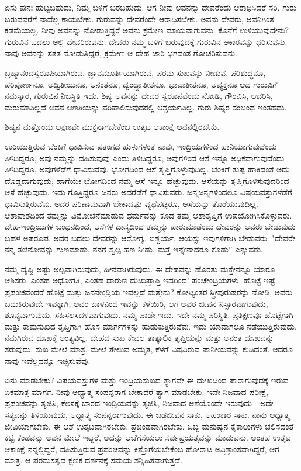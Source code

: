 ಏಸು ಪುನಃ ಹುಟ್ಟಬಹುದು, ನಿಮ್ಮ ಬಳಿಗೆ ಬರಬಹುದು. ಆಗ ನೀವು ಅವನನ್ನು ದೇವರೆಂದು ಆರಾಧಿಸಿದರೆ ಸರಿ. ಗುರು ಬರುವವರೆಗೆ ನಾವೆಲ್ಲ ಕಾಯಬೇಕು. ಗುರುವನ್ನು ದೇವರೆಂದೇ ಆರಾಧಿಸಬೇಕು. ಅವನು ದೇವರು, ಅವನಿಗಿಂತ ಕಡಮೆಯಲ್ಲ. ನೀವು ಅವನನ್ನು ನೋಡುತ್ತಿದ್ದರೆ ಅವನು ಕ್ರಮೇಣ ಮಾಯವಾಗುವನು. ಕೊನೆಗೆ ಉಳಿಯುವುದೇನು? ಗುರುವಿನ ಬದಲು ಅಲ್ಲಿ ದೇವರಿರುವನು. ದೇವರು ನಮ್ಮ ಬಳಿಗೆ ಬರುವುದಕ್ಕೆ ಗುರುವಿನ ಆಕಾರವನ್ನು ಧರಿಸುವನು. ನಾವು ಅವನನ್ನು ಸತತ ನೋಡುತ್ತಿದ್ದರೆ, ಕ್ರಮೇಣ ಆ ದೇಹ ಜಾರಿ ಭಗವಂತ ಗೋಚರಿಸುವನು.

ಬ್ರಹ್ಮಾನಂದಸ್ವರೂಪಿಯಾಗಿರುವ, ಜ್ಞಾನಮೂರ್ತಿಯಾಗಿರುವ, ಪರಮ ಸುಖವನ್ನು ನೀಡುವ, ಪರಿಶುದ್ಧನೂ, ಪರಿಪೂರ್ಣನೂ, ಅದ್ವಿತೀಯನೂ, ಅನಂತನೂ, ದ್ವಂದ್ವಾತೀತನೂ, ಭಾವಾತೀತನೂ, ಅವ್ಯಕ್ತನೂ ಆದ ಗುರುವಿಗೆ ನಮಸ್ಕಾರ, ಗುರುವಿನ ನಿಜಸ್ಥಿತಿ ಇದು. ಶಿಷ್ಯ ಅವನನ್ನು ದೇವರ ಸ್ವರೂಪವೆಂದು ನೋಡಿ, ಗೌರವಿಸಿ, ಆದರಿಸಿ, ಮರುಮಾತಿಲ್ಲದೆ ಅವನ ಆಣತಿಯನ್ನು ಪರಿಪಾಲಿಸುವುದರಲ್ಲಿ ಆಶ್ಚರ್ಯವಿಲ್ಲ. ಗುರು ಶಿಷ್ಯರ ಸಂಬಂಧ ಇಂತಹದು.

ಶಿಷ್ಯನ ಮತ್ತೊಂದು ಲಕ್ಷಣವೇ ಮುಕ್ತನಾಗಬೇಕೆಂಬ ಉತ್ಕಟ ಆಕಾಂಕ್ಷೆ ಅವನಲ್ಲಿರಬೇಕು.

ಉರಿಯುತ್ತಿರುವ ಬೆಂಕಿಗೆ ಧಾವಿಸುವ ಪತಂಗದ ಹುಳುಗಳಂತೆ ನಾವು, ಇಂದ್ರಿಯಗಳಿಂದ ಹಾನಿಯಾಗುವುದೆಂದು ತಿಳಿದಿದ್ದರೂ, ಅವು ನಮ್ಮನ್ನು ದಹಿಸುವುವು ಎಂದು ತಿಳಿದಿದ್ದರೂ, ಅವುಗಳಿಂದ ಆಸೆ ಇನ್ನೂ ಅಧಿಕವಾಗುವುದೆಂದು ತಿಳಿದಿದ್ದರೂ, ಅವುಗಳೆಡೆಗೆ ಧಾವಿಸುವೆವು. ಭೋಗದಿಂದ ಆಸೆ ತೃಪ್ತಿಗೊಳ್ಳುವುದಿಲ್ಲ. ಬೆಂಕಿಗೆ ತುಪ್ಪ ಹಾಕಿದಂತೆ ಅದು ದೊಡ್ಡದಾಗುವುದು; ಹಾಗೆಯೇ ಭೋಗದಿಂದ ನಮ್ಮ ಆಸೆ ಇನ್ನೂ ಹೆಚ್ಚುವುದು. ಆಸೆಯನ್ನು ತೃಪ್ತಿಗೊಳಿಸುವುದರಿಂದ ಆಸೆ ಹೆಚ್ಚುವುದು. ಇದು ಗೊತ್ತಿದ್ದರೂ ಜನರು ಅದರೆಡೆಗೆ ಧಾವಿಸುವರು. ಜನ್ಮಜನ್ಮಗಳಿಂದಲೂ ವಿಷಯವಸ್ತುಗಳೆಡೆಗೆ ಧಾವಿಸುತ್ತಿರುವೆವು. ಅದರ ಪರಿಣಾಮವಾಗಿ ಬೇಕಾದಷ್ಟು ವ್ಯಥೆಪಟ್ಟರೂ, ಆಸೆಯನ್ನು ತೊರೆಯುವುದಿಲ್ಲ. ಆಶಾಪಾಶದಿಂದ ತಮ್ಮನ್ನು ವಿಮೋಚನೆಮಾಡುವ ಧರ್ಮವನ್ನು ಕೂಡ ತಮ್ಮ ಆಶಾತೃಪ್ತಿಗೆ ಉಪಯೋಗಿಸಿಕೊಳ್ಳುವರು. ದೇಹ-ಇಂದ್ರಿಯಗಳ ಬಂಧನದಿಂದ, ಆಸೆಗಳ ದಾಸ್ಯದಿಂದ ತಮ್ಮನ್ನು ಪಾರುಮಾಡೆಂದು ದೇವರನ್ನು ಅವರು ಬೇಡುವುದು ಬಹಳ ಅಪರೂಪ. ಅದರ ಬದಲು ದೇವರನ್ನು ಆರೋಗ್ಯ, ಐಶ್ವರ್ಯ, ಆಯಸ್ಸು ಇವುಗಳಿಗಾಗಿ ಬೇಡುವರು. "ದೇವರೇ ನನ್ನ ತಲೆನೋವನ್ನು ಗುಣಮಾಡು, ನನಗೆ ಸ್ವಲ್ಪ ಹಣ ನೀಡು, ಮತ್ತೆ ಇನ್ನೇನಾದರೂ ಕೊಡು'' ಎನ್ನುವರು.

ನಮ್ಮ ದೃಷ್ಟಿ ಅಷ್ಟು ಅಲ್ಪವಾಗಿರುವುದು, ಹೀನವಾಗಿರುವುದು. ಈ ದೇಹವನ್ನು ಹೊರತು ಮತ್ತೇನನ್ನೂ ಯಾರೂ ಆಶಿಸರು. ಎಂತಹ ಅಧೋಗತಿ, ಎಂತಹ ದಾರುಣ ದುಃಖಪ್ರಾಪ್ತಿ ಇದರಿಂದ! ಪಂಚೇಂದ್ರಿಯಗಳು, ಹೊಟ್ಟೆ ಇಷ್ಟೆ. ಪ್ರಪಂಚವೆಂದರೆ ಹೊಟ್ಟೆ ಮತ್ತು ಜನನೇಂದ್ರಿಯ ಇವಲ್ಲದೆ ಮತ್ತೇನು? ಕೋಟ್ಯಂತರ ಸ್ತ್ರೀಪುರುಷರನ್ನು ನೋಡಿ, ಅವರು ಬದುಕಿರುವುದೇ ಇವಕ್ಕಾಗಿ, ಅವರ ಬಾಳಿನಿಂದ ಇವನ್ನು ಕಳೆಯಿರಿ, ಆಗ ಅವರ ಜೀವನ ನಿಸ್ಸಾರವಾಗುವುದು, ಶೂನ್ಯವಾಗುವುದು, ಸಹಿಸಲಸದಳವಾಗುವುದು. ನಮ್ಮ ಪಾಡೇ ಇದು. ಇದೇ ನಮ್ಮ ಪರಿಸ್ಥಿತಿ. ಪ್ರತಿಕ್ಷಣವೂ ಹೊಟ್ಟೆಗಾಗಿ ಮತ್ತು ಕಾಮಸುಖದ ತೃಪ್ತಿಗಾಗಿ ಹೊಸ ಮಾರ್ಗಗಳನ್ನು ಹುಡುಕುತ್ತಿರುವೆವು. ಇದು ಯಾವಾಗಲೂ ನಡೆಯುತ್ತಿರುವುದು. ನಮಗಿರುವ ದುಃಖಕ್ಕೆ ಅಂತ್ಯವಿಲ್ಲ. ದೇಹದ ಸುಖ ಕೇವಲ ತಾತ್ಕಾಲಿಕ ತೃಪ್ತಿಯನ್ನು ಮತ್ತು ಅನಂತ ದುಃಖವನ್ನು ತರುವುದು. ಸುಖ ಮೇಲೆ ಮಾತ್ರ. ಮೇಲೆ ತೇಲುವ ಅಮೃತ, ಕೆಳಗೆ ವಿಷವಿರುವ ಪಾನೀಯವನ್ನು ಕುಡಿದಂತೆ. ಆದರೂ ನಾವು ಇವೆಲ್ಲವನ್ನೂ ಇಚ್ಛಿಸುವೆವು.

ಏನು ಮಾಡಬೇಕು? ವಿಷಯವಸ್ತುಗಳ ಮತ್ತು ಇಂದ್ರಿಯಸುಖದ ತ್ಯಾಗವೇ ಈ ದುಃಖದಿಂದ ಪಾರಾಗುವುದಕ್ಕೆ ಇರುವ ಏಕಮಾತ್ರ ಮಾರ್ಗ. ನೀವು ಅಧ್ಯಾತ್ಮ ಸಂಪನ್ನರಾಗ ಬೇಕಾದರೆ ತ್ಯಾಗ ಮಾಡಬೇಕು. ಇದೇ ನಿಜವಾದ ಪರೀಕ್ಷೆ, ಪ್ರಪಂಚವನ್ನು ತ್ಯಜಿಸಿ, ಕೆಲಸಕ್ಕೆ ಬಾರದ ಇಂದ್ರಿಯವನ್ನು ತ್ಯಜಿಸಿ, ನಿಜವಾದ ಆಶೆಯೊಂದೇ ಇರುವುದು - ಅದೇ ಸತ್ಯವನ್ನು ತಿಳಿಯುವುದು, ಅಧ್ಯಾತ್ಮ ಸಂಪನ್ನರಾಗುವುದು. ಈ ಜಡಜೀವನ ಸಾಕು, ಅಹಂಕಾರ ಸಾಕು. ನಾನು ಅಧ್ಯಾತ್ಮ ಜೀವಿಯಾಗಬೇಕು. ಈ ಆಶೆ ಉತ್ಕಟವಾಗಿರಬೇಕು, ಪ್ರಚಂಡವಾಗಿರಬೇಕು. ಒಬ್ಬ ಮನುಷ್ಯನ ಕೈಕಾಲುಗಳು ಚಲಿಸದಂತೆ ಕಟ್ಟಿ ಕೆಂಡವನ್ನು ಅವನ ಮೇಲೆ ಇಟ್ಟರೆ, ಅದನ್ನು ಆಚೆಗೆಸೆಯಲು ಸರ್ವಪ್ರಯತ್ನವನ್ನು ಮಾಡುವನು. ಅಂತಹ ಉತ್ಕಟ ಆಕಾಂಕ್ಷೆ ನನ್ನಲ್ಲಿದ್ದರೆ, ದಹಿಸುತ್ತಿರುವ ಪ್ರಪಂಚವನ್ನು ಕಿತ್ತೊಗೆಯಬೇಕೆಂಬ ಹೋರಾಟ ಅವಿಶ್ರಾಂತವಾಗಿದ್ದರೆ, ಆಗ ಮಾತ್ರ. ಆ ಪರಮಸತ್ಯದ ಕ್ಷಣಿಕ ದರ್ಶನಕ್ಕೆ ಸಮಯ ಸನ್ನಿಹಿತವಾಗುತ್ತದೆ.

